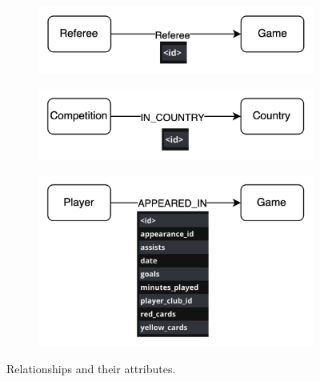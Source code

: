 \documentclass{Configuration_Files/PoliMi3i_thesis}
\begin{document}
\begin{figure}[H]
  \vspace{1em}


    \begin{subfigure}[b]{0.45\linewidth}
    \includegraphics[width=\linewidth]{Project Template/Images/relationships/referee.png}
  \end{subfigure}
  \hfill
  \begin{subfigure}[b]{0.45\linewidth}
    \includegraphics[width=\linewidth]{Project Template/Images/relationships/incountry.png}
  \end{subfigure}
  
  \vspace{1em}

    \begin{subfigure}[b]{0.45\linewidth}
    \includegraphics[width=\linewidth]{Project Template/Images/relationships/appearances.png}
  \end{subfigure}
  
  
  \caption{Relationships and their attributes.}
\end{figure}
\end{document}
